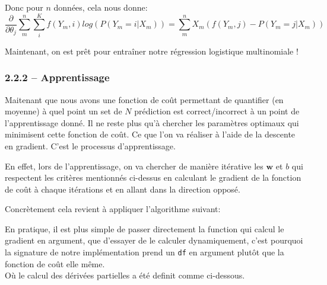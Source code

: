 \documentclass[
]{article}
\begin{document}
Donc pour \(n\) données, cela nous donne:
\[\frac{\partial}{\partial \theta_{j}} \sum_m^n \sum_i^K f(Y_m, i)log(P(Y_m = i | X_m)) = \sum_m^n X_m(f(Y_m, j) - P(Y_m = j|X_m))\]

Maintenant, on est prêt pour entraîner notre régression logistique
multinomiale !

\subsubsection{2.2.2 -- Apprentissage}\label{apprentissage}

Maitenant que nous avons une fonction de coût permettant de quantifier
(en moyenne) à quel point un set de \(N\) prédiction est
correct/incorrect à un point de l'apprentissage donné. Il ne reste plus
qu'à chercher les paramètres optimaux qui minimisent cette fonction de
coût. Ce que l'on va réaliser à l'aide de la descente en gradient. C'est
le processus d'apprentissage.

En effet, lors de l'apprentissage, on va chercher de manière itérative
les \(\mathbf{w}\) et \(b\) qui respectent les critères mentionnés
ci-dessus en calculant le gradient de la fonction de coût à chaque
itérations et en allant dans la direction opposé.

Concrètement cela revient à appliquer l'algorithme suivant:

En pratique, il est plus simple de passer directement la function qui
calcul le gradient en argument, que d'essayer de le calculer
dynamiquement, c'est pourquoi la signature de notre implémentation prend
un \texttt{df} en argument plutôt que la fonction de coût elle même.\\
Où le calcul des dérivées partielles a été definit comme ci-dessous.
\end{document}
